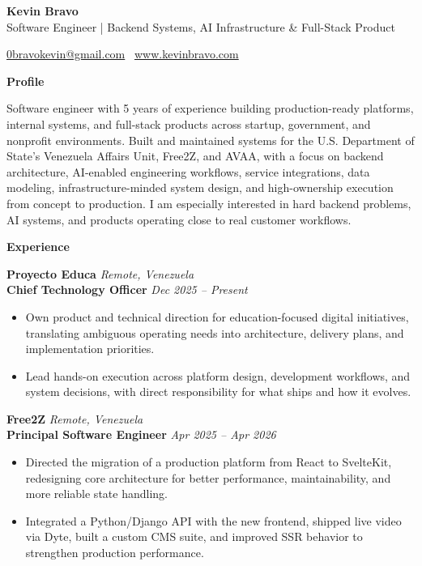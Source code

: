 \documentclass[11pt]{article}
\begin{document}
\begin{center}
    {\LARGE \textbf{Kevin Bravo}}\\
    Software Engineer | Backend Systems, AI Infrastructure \& Full-Stack Product \\
    \hrulefill
\end{center}
\begin{center}
    \href{mailto:0bravokevin@gmail.com}{0bravokevin@gmail.com}
    \textbullet\ 
    \href{http://www.kevinbravo.com}{www.kevinbravo.com}
\end{center}
\vspace{4pt}
\begin{center}
    \textbf{Profile}
\end{center}
\vspace{-4pt}
Software engineer with 5 years of experience building production-ready platforms, internal systems, and full-stack products across startup, government, and nonprofit environments. Built and maintained systems for the U.S. Department of State's Venezuela Affairs Unit, Free2Z, and AVAA, with a focus on backend architecture, AI-enabled engineering workflows, service integrations, data modeling, infrastructure-minded system design, and high-ownership execution from concept to production. I am especially interested in hard backend problems, AI systems, and products operating close to real customer workflows.
\vspace{8pt}
\begin{center}
    \textbf{Experience}
\end{center}
\vspace{-4pt}
\textbf{Proyecto Educa} \hfill \textit{Remote, Venezuela} \\
\textbf{Chief Technology Officer} \hfill \textit{Dec 2025 -- Present}
\begin{itemize}
    \item Own product and technical direction for education-focused digital initiatives, translating ambiguous operating needs into architecture, delivery plans, and implementation priorities.
    \item Lead hands-on execution across platform design, development workflows, and system decisions, with direct responsibility for what ships and how it evolves.
\end{itemize}
\vspace{10pt}
\textbf{Free2Z} \hfill \textit{Remote, Venezuela} \\
\textbf{Principal Software Engineer} \hfill \textit{Apr 2025 -- Apr 2026}
\begin{itemize}
    \item Directed the migration of a production platform from React to SvelteKit, redesigning core architecture for better performance, maintainability, and more reliable state handling.
    \item Integrated a Python/Django API with the new frontend, shipped live video via Dyte, built a custom CMS suite, and improved SSR behavior to strengthen production performance.
\end{itemize}
\end{document}
